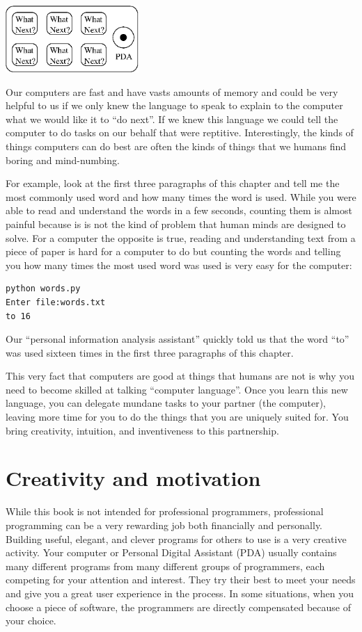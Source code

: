 \documentclass[10pt]{book}
\begin{document}
\beforefig
\centerline{\includegraphics[height=1.00in]{figs2/pda.eps}}
\afterfig


Our computers are fast and have vasts amounts of memory and 
could be very helpful to us if we only knew the language to
speak to explain to the computer what we would like it to 
``do next''.  If we knew this language we could tell the 
computer to do tasks on our behalf that were reptitive.  
Interestingly, the kinds of things computers can do best
are often the kinds of things that we humans find boring
and mind-numbing.

For example, look at the first three paragraphs of this
chapter and tell me the most commonly used word and how
many times the word is used.  While you were able to read
and understand the words in a few seconds, counting them
is almost painful because is is not the kind of problem 
that human minds are designed to solve.  For a computer
the opposite is true, reading and understanding text 
from a piece of paper is hard for a computer to do 
but counting the words and telling you how many times
the most used word was used is very easy for the
computer:

\beforeverb
\begin{verbatim}
python words.py
Enter file:words.txt
to 16
\end{verbatim}
\afterverb
%
Our ``personal information analysis assistant'' quickly 
told us that the word ``to'' was used sixteen times in the
first three paragraphs of this chapter.

This very fact that computers are good at things 
that humans are not is why you need to become
skilled at talking ``computer language''.  Once you learn
this new language, you can delegate mundane tasks
to your partner (the computer), leaving more time 
for you to do the 
things that you are uniquely suited for.  You bring 
creativity, intuition, and inventiveness to this
partnership.  

\section{Creativity and motivation}

While this book is not intended for professional programmers, professional
programming can be a very rewarding job both financially and personally.
Building useful, elegant, and clever programs for others to use is a very
creative activity.  Your computer or Personal Digital Assistant (PDA) 
usually contains many different programs from many different groups of 
programmers, each competing for your attention and interest.  They try 
their best to meet your needs and give you a great user experience in the
process.   In some situations, when you choose a piece of software, the 
programmers are directly compensated because of your choice.
\end{document}
